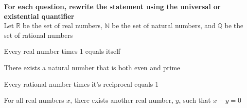 \documentclass[addpoints]{exam}
\begin{document}
\textbf{For each question, rewrite the statement using the universal or existential quantifier} \\ 
Let $\mathbb{R}$ be the set of real numbers, $\mathbb{N}$ be the set of natural numbers, and $\mathbb{Q}$ be the set of rational numbers

\begin{questions}
  \begin{minipage}{0.45\linewidth}
    \question Every real number times 1 equals itself
  \end{minipage}
  \hfill 
  \begin{minipage}{0.45\linewidth}
    \question There exists a natural number that is both even and prime
  \end{minipage} 

  \begin{minipage}{0.45\linewidth}
    \question Every rational number times it's reciprocal equals 1
  \end{minipage}
  \hfill 
  \begin{minipage}{0.45\linewidth}
    \question For all real numbers $x$, there exists another real number, $y$, such that $x+y=0$
  \end{minipage}
  
\end{questions}
\end{document}

